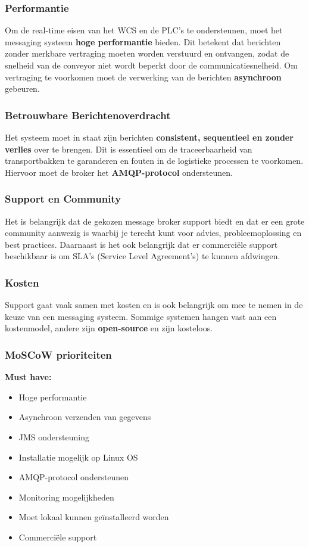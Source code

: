 \subsubsection{Performantie}
Om de real-time eisen van het WCS en de PLC’s te ondersteunen, moet het messaging systeem \textbf{hoge performantie} bieden. 
Dit betekent dat berichten zonder merkbare vertraging moeten worden verstuurd en ontvangen, 
zodat de snelheid van de conveyor niet wordt beperkt door de communicatiesnelheid.
Om vertraging te voorkomen moet de verwerking van de berichten \textbf{asynchroon} gebeuren.

\subsubsection{Betrouwbare Berichtenoverdracht}
Het systeem moet in staat zijn berichten \textbf{consistent, sequentieel en zonder verlies} over te brengen. 
Dit is essentieel om de traceerbaarheid van transportbakken te garanderen en fouten in de logistieke processen te voorkomen.
Hiervoor moet de broker het \textbf{AMQP-protocol} ondersteunen.

\subsubsection{Support en Community}
Het is belangrijk dat de gekozen message broker support biedt en dat er een grote community aanwezig is 
waarbij je terecht kunt voor advies, probleemoplossing en best practices.
Daarnaast is het ook belangrijk dat er commerciële support beschikbaar is om SLA's (Service Level Agreement's) te kunnen afdwingen.

\subsubsection{Kosten}
Support gaat vaak samen met kosten en is ook belangrijk om mee te nemen in de keuze van een messaging systeem.
Sommige systemen hangen vast aan een kostenmodel, andere zijn \textbf{open-source} en zijn kosteloos.
\newpage
\subsubsection{MoSCoW prioriteiten}

\textbf{Must have:}
\begin{itemize}
\item Hoge performantie 
\item Asynchroon verzenden van gegevens  
\item JMS ondersteuning
\item Installatie mogelijk op Linux OS 
\item AMQP-protocol ondersteunen 
\item Monitoring mogelijkheden
\item Moet lokaal kunnen geïnstalleerd worden
\item Commerciële support
\end{itemize}

